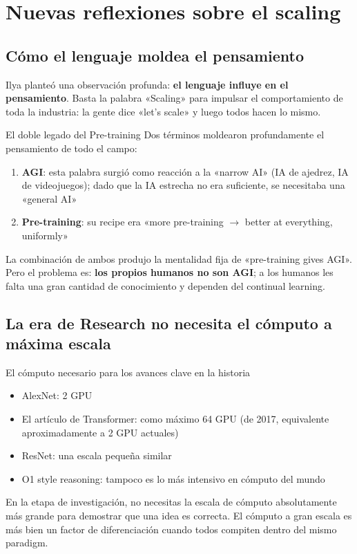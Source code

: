 \section{Nuevas reflexiones sobre el scaling}

\subsection{Cómo el lenguaje moldea el pensamiento}

Ilya planteó una observación profunda: \textbf{el lenguaje influye en el pensamiento}. Basta la palabra «Scaling» para impulsar el comportamiento de toda la industria: la gente dice «let's scale» y luego todos hacen lo mismo.

\begin{importantbox}{El doble legado del Pre-training}
Dos términos moldearon profundamente el pensamiento de todo el campo:
\begin{enumerate}
    \item \textbf{AGI}: esta palabra surgió como reacción a la «narrow AI» (IA de ajedrez, IA de videojuegos); dado que la IA estrecha no era suficiente, se necesitaba una «general AI»
    \item \textbf{Pre-training}: su recipe era «more pre-training $\rightarrow$ better at everything, uniformly»
\end{enumerate}
La combinación de ambos produjo la mentalidad fija de «pre-training gives AGI». Pero el problema es: \textbf{los propios humanos no son AGI}; a los humanos les falta una gran cantidad de conocimiento y dependen del continual learning.
\end{importantbox}

\subsection{La era de Research no necesita el cómputo a máxima escala}

\begin{knowledgebox}{El cómputo necesario para los avances clave en la historia}
\begin{itemize}
    \item AlexNet: 2 GPU
    \item El artículo de Transformer: como máximo 64 GPU (de 2017, equivalente aproximadamente a 2 GPU actuales)
    \item ResNet: una escala pequeña similar
    \item O1 style reasoning: tampoco es lo más intensivo en cómputo del mundo
\end{itemize}
En la etapa de investigación, no necesitas la escala de cómputo absolutamente más grande para demostrar que una idea es correcta. El cómputo a gran escala es más bien un factor de diferenciación cuando todos compiten dentro del mismo paradigm.
\end{knowledgebox}


